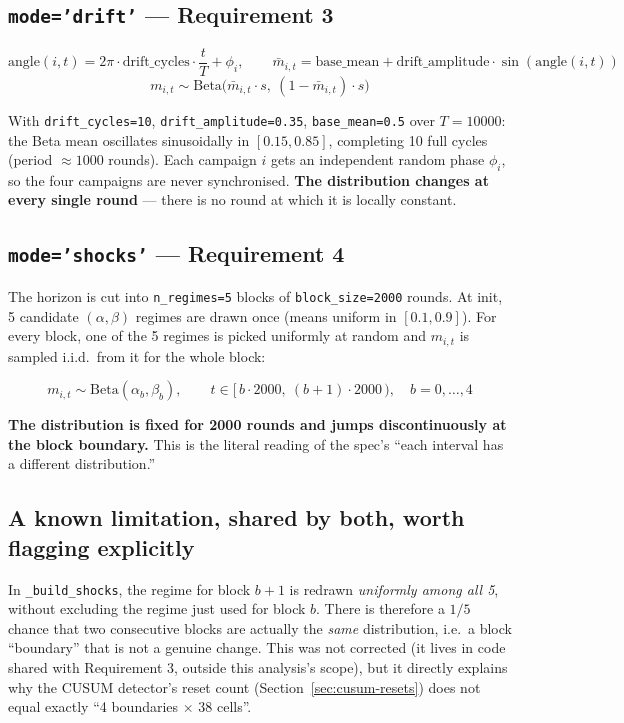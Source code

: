 \documentclass[11pt,a4paper]{article}
\newcommand{\1}{\mathbf{1}}
\begin{document}
\subsection{\texttt{mode='drift'} --- Requirement 3}

\[
  \text{angle}(i,t) = 2\pi \cdot \text{drift\_cycles} \cdot \frac{t}{T} + \phi_i, \qquad
  \bar m_{i,t} = \text{base\_mean} + \text{drift\_amplitude}\cdot\sin(\text{angle}(i,t))
\]
\[
  m_{i,t} \sim \mathrm{Beta}\big(\bar m_{i,t}\cdot s,\ (1-\bar m_{i,t})\cdot s\big)
\]

With \texttt{drift\_cycles=10}, \texttt{drift\_amplitude=0.35}, \texttt{base\_mean=0.5} over $T=10000$: the Beta mean oscillates sinusoidally in $[0.15, 0.85]$, completing 10 full cycles (period $\approx 1000$ rounds). Each campaign $i$ gets an independent random phase $\phi_i$, so the four campaigns are never synchronised. \textbf{The distribution changes at every single round} --- there is no round at which it is locally constant.

\subsection{\texttt{mode='shocks'} --- Requirement 4}

The horizon is cut into \texttt{n\_regimes=5} blocks of \texttt{block\_size=2000} rounds. At init, 5 candidate $(\alpha,\beta)$ regimes are drawn once (means uniform in $[0.1,0.9]$). For every block, one of the 5 regimes is picked uniformly at random and $m_{i,t}$ is sampled i.i.d.\ from it for the whole block:

\[
  m_{i,t} \sim \mathrm{Beta}(\alpha_b, \beta_b), \qquad t \in [\,b\cdot 2000,\ (b+1)\cdot 2000\,), \quad b = 0,\dots,4
\]

\textbf{The distribution is fixed for 2000 rounds and jumps discontinuously at the block boundary.} This is the literal reading of the spec's ``each interval has a different distribution.''

\subsection{A known limitation, shared by both, worth flagging explicitly}

\begin{center}
\colorbox{softred}{\parbox{0.94\linewidth}{
In \texttt{\_build\_shocks}, the regime for block $b+1$ is redrawn \emph{uniformly among all 5}, without excluding the regime just used for block $b$. There is therefore a $1/5$ chance that two consecutive blocks are actually the \emph{same} distribution, i.e.\ a block ``boundary'' that is not a genuine change. This was not corrected (it lives in code shared with Requirement 3, outside this analysis's scope), but it directly explains why the CUSUM detector's reset count (Section~\ref{sec:cusum-resets}) does not equal exactly ``4 boundaries $\times$ 38 cells''.
}}
\end{center}
\end{document}
